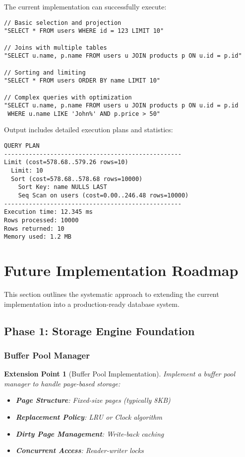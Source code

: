 \documentclass[12pt,a4paper]{article}
\newtheorem{extension}{Extension Point}[section]
\begin{document}
    The current implementation can successfully execute:

    \begin{lstlisting}[style=cpp, caption=Supported Query Examples]
// Basic selection and projection
"SELECT * FROM users WHERE id = 123 LIMIT 10"

// Joins with multiple tables
"SELECT u.name, p.name FROM users u JOIN products p ON u.id = p.id"

// Sorting and limiting
"SELECT * FROM users ORDER BY name LIMIT 10"

// Complex queries with optimization
"SELECT u.name, p.name FROM users u JOIN products p ON u.id = p.id
 WHERE u.name LIKE 'John%' AND p.price > 50"
    \end{lstlisting}

    Output includes detailed execution plans and statistics:

    \begin{lstlisting}[caption=Example Execution Plan Output]
QUERY PLAN
--------------------------------------------------
Limit (cost=578.68..579.26 rows=10)
  Limit: 10
  Sort (cost=578.68..578.68 rows=10000)
    Sort Key: name NULLS LAST
    Seq Scan on users (cost=0.00..246.48 rows=10000)
--------------------------------------------------
Execution time: 12.345 ms
Rows processed: 10000
Rows returned: 10
Memory used: 1.2 MB
    \end{lstlisting}

    \section{Future Implementation Roadmap}

    This section outlines the systematic approach to extending the current implementation into a production-ready database system.

    \subsection{Phase 1: Storage Engine Foundation}

    \subsubsection{Buffer Pool Manager}

    \begin{extension}[Buffer Pool Implementation]
        Implement a buffer pool manager to handle page-based storage:

        \begin{itemize}
            \item \textbf{Page Structure}: Fixed-size pages (typically 8KB)
            \item \textbf{Replacement Policy}: LRU or Clock algorithm
            \item \textbf{Dirty Page Management}: Write-back caching
            \item \textbf{Concurrent Access}: Reader-writer locks
        \end{itemize}
    \end{extension}
\end{document}
